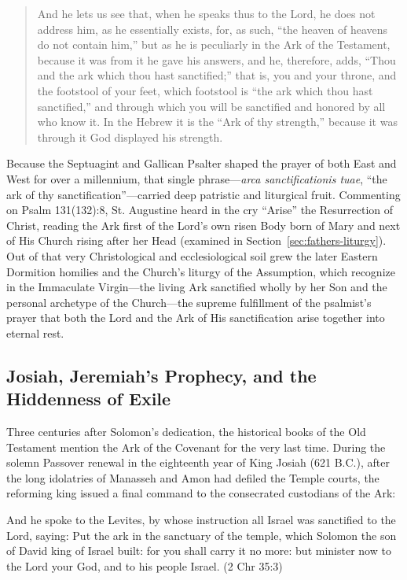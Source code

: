 \begin{quote}\small
And he lets us see that, when he speaks thus to the Lord, he does not address him, as he essentially exists, for, as such, ``the heaven of heavens do not contain him,'' but as he is peculiarly in the Ark of the Testament, because it was from it he gave his answers, and he, therefore, adds, ``Thou and the ark which thou hast sanctified;'' that is, you and your throne, and the footstool of your feet, which footstool is ``the ark which thou hast sanctified,'' and through which you will be sanctified and honored by all who know it. In the Hebrew it is the ``Ark of thy strength,'' because it was through it God displayed his strength.
\end{quote}

Because the Septuagint and Gallican Psalter shaped the prayer of both East and West for over a millennium, that single phrase---\textit{arca sanctificationis tuae}, ``the ark of thy sanctification''---carried deep patristic and liturgical fruit. Commenting on Psalm 131(132):8, St. Augustine heard in the cry ``Arise'' the Resurrection of Christ, reading the Ark first of the Lord's own risen Body born of Mary and next of His Church rising after her Head (examined in Section~\ref{sec:fathers-liturgy}). Out of that very Christological and ecclesiological soil grew the later Eastern Dormition homilies and the Church's liturgy of the Assumption, which recognize in the Immaculate Virgin---the living Ark sanctified wholly by her Son and the personal archetype of the Church---the supreme fulfillment of the psalmist's prayer that both the Lord and the Ark of His sanctification arise together into eternal rest.

\subsection{Josiah, Jeremiah's Prophecy, and the Hiddenness of Exile}

Three centuries after Solomon's dedication, the historical books of the Old Testament mention the Ark of the Covenant for the very last time. During the solemn Passover renewal in the eighteenth year of King Josiah (621 B.C.), after the long idolatries of Manasseh and Amon had defiled the Temple courts, the reforming king issued a final command to the consecrated custodians of the Ark:

\begin{scriptureblock}
And he spoke to the Levites, by whose instruction all Israel was sanctified to the Lord, saying: Put the ark in the sanctuary of the temple, which Solomon the son of David king of Israel built: for you shall carry it no more: but minister now to the Lord your God, and to his people Israel. \textnormal{(2 Chr 35:3)}
\end{scriptureblock}

